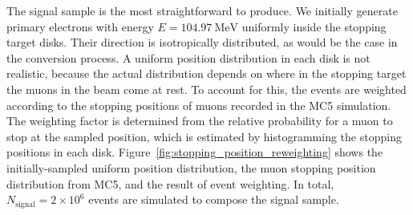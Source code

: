 The signal sample is the most straightforward to produce. We initially generate
primary electrons with energy $E=\SI{104.97}{\MeV}$ uniformly inside the
stopping target disks. Their direction is isotropically distributed, as would be
the case in the conversion process. A uniform position distribution in each disk
is not realistic, because the actual distribution depends on where in the
stopping target the muons in the beam come at rest. To account for this, the
events are weighted according to the stopping positions of muons recorded in the
MC5 simulation. The weighting factor is determined from the relative probability
for a muon to stop at the sampled position, which is estimated by histogramming
the stopping positions in each disk.
Figure~\ref{fig:stopping_position_reweighting} shows the initially-sampled
uniform position distribution, the muon stopping position distribution from MC5,
and the result of event weighting. In total, $N_\mathrm{signal} =
2\times 10^6$ events are simulated to compose the signal sample.


